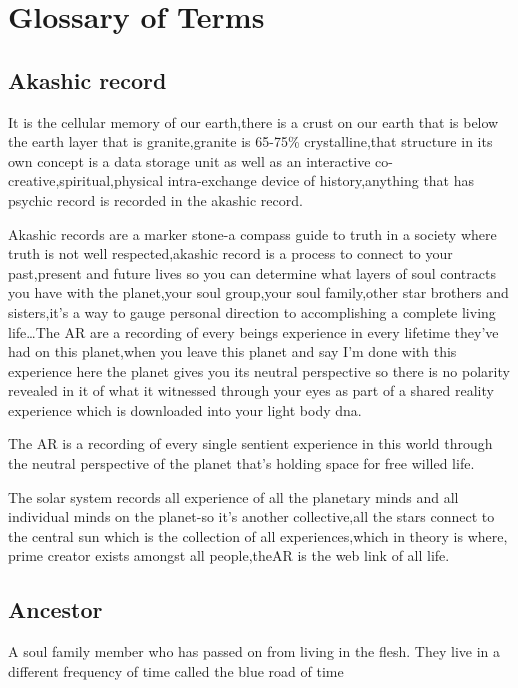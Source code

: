 \section{Glossary of Terms}\label{glossary-of-terms}

\subsection{Akashic record}\label{akashic-record}

It is the cellular memory of our earth,there is a crust on our earth
that is below the earth layer that is granite,granite is 65-75\%
crystalline,that structure in its own concept is a data storage unit as
well as an interactive co-creative,spiritual,physical intra-exchange
device of history,anything that has psychic record is recorded in the
akashic record.

Akashic records are a marker stone-a compass guide to truth in a society
where truth is not well respected,akashic record is a process to connect
to your past,present and future lives so you can determine what layers
of soul contracts you have with the planet,your soul group,your soul
family,other star brothers and sisters,it's a way to gauge personal
direction to accomplishing a complete living life\ldots{}The AR are a
recording of every beings experience in every lifetime they've had on
this planet,when you leave this planet and say I'm done with this
experience here the planet gives you its neutral perspective so there is
no polarity revealed in it of what it witnessed through your eyes as
part of a shared reality experience which is downloaded into your light
body dna.

The AR is a recording of every single sentient experience in this world
through the neutral perspective of the planet that's holding space for
free willed life.

The solar system records all experience of all the planetary minds and
all individual minds on the planet-so it's another collective,all the
stars connect to the central sun which is the collection of all
experiences,which in theory is where, prime creator exists amongst all
people,theAR is the web link of all life.

\subsection{Ancestor}\label{ancestor}

A soul family member who has passed on from living in the flesh. They
live in a different frequency of time called the blue road of time

